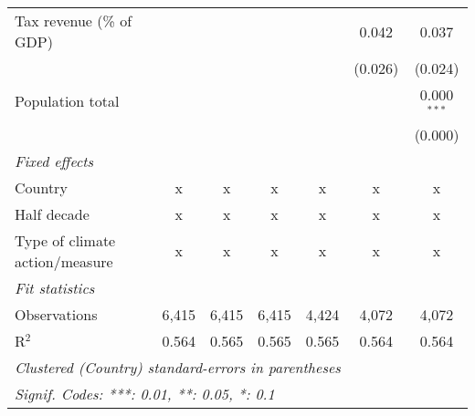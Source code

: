 \begin{tabular}{lcccccc}
   Tax revenue (\% of GDP)                &         &                &                &                & 0.042          & 0.037\\   
                                          &         &                &                &                & (0.026)        & (0.024)\\   
   Population total                       &         &                &                &                &                & 0.000$^{***}$\\   
                                          &         &                &                &                &                & (0.000)\\   
   \emph{Fixed effects}\\
   Country                                & x       & x              & x              & x              & x              & x\\  
   Half decade                            & x       & x              & x              & x              & x              & x\\  
   Type of climate action/measure         & x       & x              & x              & x              & x              & x\\  
   \midrule \emph{Fit statistics}\\
   Observations                           & 6,415   & 6,415          & 6,415          & 4,424          & 4,072          & 4,072\\  
   R$^2$                                  & 0.564   & 0.565          & 0.565          & 0.565          & 0.564          & 0.564\\  
   \midrule
   \multicolumn{7}{l}{\emph{Clustered (Country) standard-errors in parentheses}}\\
   \multicolumn{7}{l}{\emph{Signif. Codes: ***: 0.01, **: 0.05, *: 0.1}}\\
\end{tabular}
\par\endgroup


